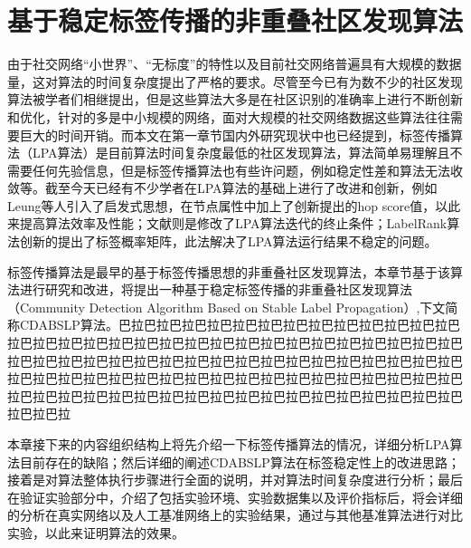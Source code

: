 \chapter{基于稳定标签传播的非重叠社区发现算法}
由于社交网络“小世界”、“无标度”的特性以及目前社交网络普遍具有大规模的数据量，这对算法的时间复杂度提出了严格的要求。尽管至今已有为数不少的社区发现算法被学者们相继提出，但是这些算法大多是在社区识别的准确率上进行不断创新和优化，针对的多是中小规模的网络，面对大规模的社交网络数据这些算法往往需要巨大的时间开销。而本文在第一章节国内外研究现状中也已经提到，标签传播算法（LPA算法）\cite{Raghavan2007Near}是目前算法时间复杂度最低的社区发现算法，算法简单易理解且不需要任何先验信息，但是标签传播算法也有些许问题，例如稳定性差和算法无法收敛等。截至今天已经有不少学者在LPA算法的基础上进行了改进和创新，例如Leung等人\cite{Leung2009Towards}引入了启发式思想，在节点属性中加上了创新提出的hop score值，以此来提高算法效率及性能；文献\cite{He2014A}则是修改了LPA算法迭代的终止条件；LabelRank算法\cite{Xie2013LabelRank}创新的提出了标签概率矩阵，此法解决了LPA算法运行结果不稳定的问题。

标签传播算法是最早的基于标签传播思想的非重叠社区发现算法，本章节基于该算法进行研究和改进，将提出一种基于稳定标签传播的非重叠社区发现算法（Community Detection Algorithm Based on Stable Label Propagation）,下文简称CDABSLP算法。巴拉巴拉巴拉巴拉巴拉巴拉巴拉巴拉巴拉巴拉巴拉巴拉巴拉巴拉巴拉巴拉巴拉巴拉巴拉巴拉巴拉巴拉巴拉巴拉巴拉巴拉巴拉巴拉巴拉巴拉巴拉巴拉巴拉巴拉巴拉巴拉巴拉巴拉巴拉巴拉巴拉巴拉巴拉巴拉巴拉巴拉巴拉巴拉巴拉巴拉巴拉巴拉巴拉巴拉巴拉巴拉巴拉巴拉巴拉巴拉巴拉巴拉巴拉巴拉巴拉巴拉巴拉巴拉巴拉巴拉巴拉巴拉巴拉巴拉巴拉巴拉巴拉巴拉巴拉巴拉巴拉巴拉巴拉巴拉巴拉巴拉巴拉巴拉


本章接下来的内容组织结构上将先介绍一下标签传播算法的情况，详细分析LPA算法目前存在的缺陷；然后详细的阐述CDABSLP算法在标签稳定性上的改进思路；接着是对算法整体执行步骤进行全面的说明，并对算法时间复杂度进行分析；最后在验证实验部分中，介绍了包括实验环境、实验数据集以及评价指标后，将会详细的分析在真实网络以及人工基准网络上的实验结果，通过与其他基准算法进行对比实验，以此来证明算法的效果。

